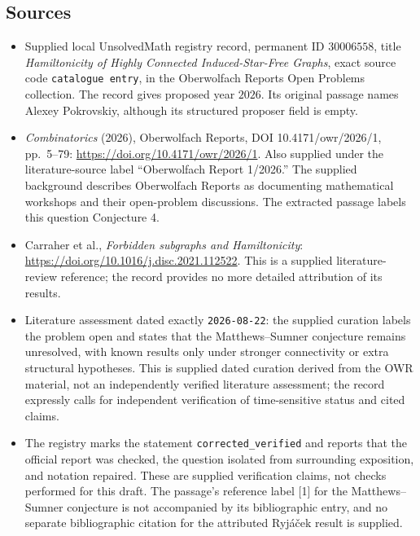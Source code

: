 \documentclass[11pt]{article}
\begin{document}
\subsection{Sources}
\begin{itemize}
\item Supplied local UnsolvedMath registry record, permanent ID \(30006558\), title \emph{Hamiltonicity of Highly Connected Induced-Star-Free Graphs}, exact source code \texttt{catalogue entry}, in the Oberwolfach Reports Open Problems collection. The record gives proposed year \(2026\). Its original passage names Alexey Pokrovskiy, although its structured proposer field is empty.
\item \emph{Combinatorics} (2026), Oberwolfach Reports, DOI 10.4171/owr/2026/1, pp.~5--79: \url{https://doi.org/10.4171/owr/2026/1}. Also supplied under the literature-source label ``Oberwolfach Report 1/2026.'' The supplied background describes Oberwolfach Reports as documenting mathematical workshops and their open-problem discussions. The extracted passage labels this question Conjecture 4.
\item Carraher et al., \emph{Forbidden subgraphs and Hamiltonicity}: \url{https://doi.org/10.1016/j.disc.2021.112522}. This is a supplied literature-review reference; the record provides no more detailed attribution of its results.
\item Literature assessment dated exactly \texttt{2026-08-22}: the supplied curation labels the problem open and states that the Matthews--Sumner conjecture remains unresolved, with known results only under stronger connectivity or extra structural hypotheses. This is supplied dated curation derived from the OWR material, not an independently verified literature assessment; the record expressly calls for independent verification of time-sensitive status and cited claims.
\item The registry marks the statement \texttt{corrected\_verified} and reports that the official report was checked, the question isolated from surrounding exposition, and notation repaired. These are supplied verification claims, not checks performed for this draft. The passage's reference label [1] for the Matthews--Sumner conjecture is not accompanied by its bibliographic entry, and no separate bibliographic citation for the attributed Ryj\'{a}\v{c}ek result is supplied.
\end{itemize}
\end{document}

